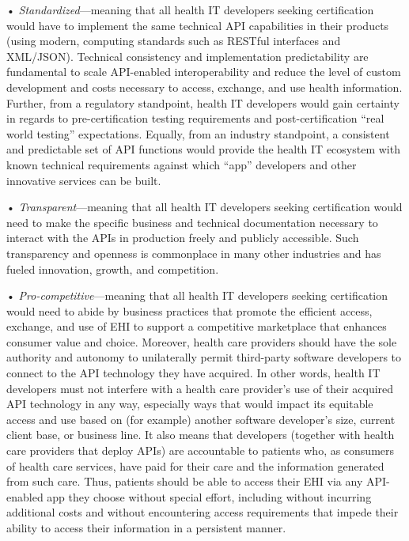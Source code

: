 \documentclass[twoside,11pt]{article}
\begin{document}
          • \emph{Standardized}—meaning that all health IT developers seeking certification would have to implement the same technical API capabilities in their products (using modern, computing standards such as RESTful interfaces and XML/JSON). Technical consistency and implementation predictability are fundamental to scale API-enabled interoperability and reduce the level of custom development and costs necessary to access, exchange, and use health information. Further, from a regulatory standpoint, health IT developers would gain certainty in regards to pre-certification testing requirements and post-certification “real world testing” expectations. Equally, from an industry standpoint, a consistent and predictable set of API functions would provide the health IT ecosystem with known technical requirements against which “app” developers and other innovative services can be built.


          • \emph{Transparent}—meaning that all health IT developers seeking certification would need to make the specific business and technical documentation necessary to interact with the APIs in production freely and publicly accessible. Such transparency and openness is commonplace in many other industries and has fueled innovation, growth, and competition.


          • \emph{Pro-competitive}—meaning that all health IT developers seeking certification would need to abide by business practices that promote the efficient access, exchange, and use of EHI to support a competitive marketplace that enhances consumer value and choice. Moreover, health care providers should have the sole authority and autonomy to unilaterally permit third-party software developers to connect to the API technology they have acquired. In other words, health IT developers must not interfere with a health care provider's use of their acquired API technology in any way, especially ways that would impact its equitable access and use based on (for example) another software developer's size, current client base, or business line. It also means that developers (together with health care providers that deploy APIs) are accountable to patients who, as consumers of health care services, have paid for their care and the information generated from such care. Thus, patients should be able to access their EHI via any API-enabled app they choose without special effort, including without incurring additional costs and without encountering access requirements that impede their ability to access their information in a persistent manner.
\end{document}
